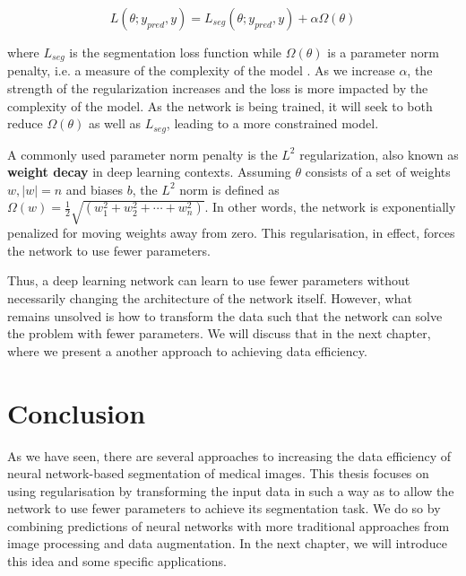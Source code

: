 \begin{equation}
	L(\theta; y_{pred}, y) = L_{seg}(\theta; y_{pred}, y) + \alpha\Omega(\theta)
\end{equation}

where $L_{seg}$ is the segmentation loss function while $\Omega(\theta)$ is a parameter norm penalty, i.e. a measure of the complexity of the model \cite{goodfellowDeepLearning2016}. As we increase $\alpha$, the strength of the regularization increases and the loss is more impacted by the complexity of the model. As the network is being trained, it will seek to both reduce $\Omega(\theta)$ as well as $L_{seg}$, leading to a more constrained model.

A commonly used parameter norm penalty is the $L^2$ regularization, also known as \textbf{weight decay} in deep learning contexts. Assuming $\theta$ consists of a set of weights $w, \lvert w \rvert = n$ and biases $b$, the $L^2$ norm is defined as $\Omega(w) = \frac{1}{2}\sqrt{(w_1^2 + w_2^2 + \cdots + w_n^2)}$. In other words, the network is exponentially penalized for moving weights away from zero. This regularisation, in effect, forces the network to use fewer parameters.

Thus, a deep learning network can learn to use fewer parameters without necessarily changing the architecture of the network itself. However, what remains unsolved is how to transform the data such that the network can solve the problem with fewer parameters. We will discuss that in the next chapter, where we present a another approach to achieving data efficiency.

\section{Conclusion}

As we have seen, there are several approaches to increasing the data efficiency of neural network-based segmentation of medical images. This thesis focuses on using regularisation by transforming the input data in such a way as to allow the network to use fewer parameters to achieve its segmentation task. We do so by combining predictions of neural networks with more traditional approaches from image processing and data augmentation. In the next chapter, we will introduce this idea and some specific applications.

